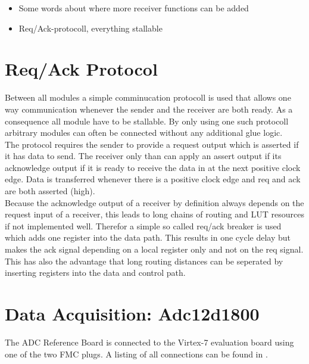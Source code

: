 \begin{itemize}
\item Some words about where more receiver functions can be added
\item Req/Ack-protocoll, everything stallable
\end{itemize}

\section{Req/Ack Protocol}
\label{sec:fpga_reqack}
Between all modules a simple comminucation protocoll is used that allows
one way communication whenever the sender and the receiver are both
ready. As a consequence all module have to be stallable. By only using
one such protocoll arbitrary modules can often be connected
without any additional glue logic. \\

The protocol requires the sender to provide a request output which
is asserted if it has data to send. The receiver only than can apply
an assert output if its acknowledge output if it is ready to receive
the data in at the next positive clock edge. Data is transferred whenever
there is a positive clock edge and req and ack are both asserted (high). \\

Because the acknowledge output of a receiver by definition always depends on the
request input of a receiver, this leads to long chains of routing and
\gls{LUT} resources if not implemented well. Therefor a simple so called
req/ack breaker is used which adds one register into the data path. This results
in one cycle delay but makes the ack signal depending on a local register
only and not on the req signal. \\

This has also the advantage that long routing distances can be seperated by
inserting registers into the data and control path.


\section{Data Acquisition: Adc12d1800}
\label{sec:fpga_adc}

The \gls{ADC} Reference Board is connected to the Virtex-7 evaluation board using 
one of the two \gls{FMC} plugs. A listing of all connections can be found in
. \\

